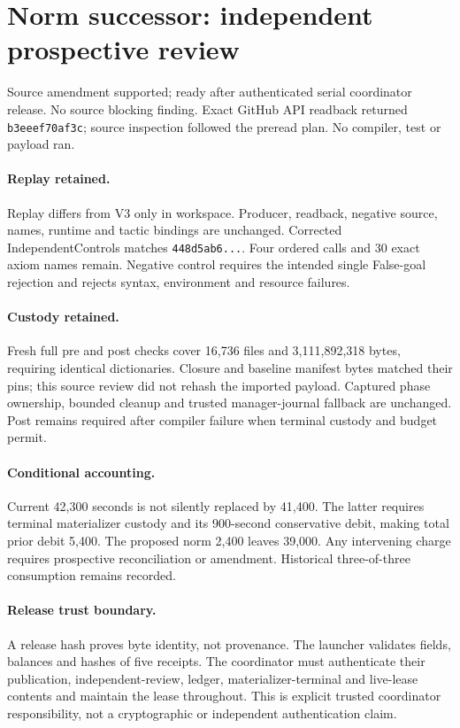 \documentclass[10pt]{article}
\begin{document}
\section*{Norm successor: independent prospective review}
Source amendment supported; ready after authenticated serial coordinator release. No source blocking finding. Exact GitHub API readback returned \texttt{b3eeef70af3c}; source inspection followed the preread plan. No compiler, test or payload ran.
\paragraph{Replay retained.} Replay differs from V3 only in workspace. Producer, readback, negative source, names, runtime and tactic bindings are unchanged. Corrected IndependentControls matches \texttt{448d5ab6...}. Four ordered calls and 30 exact axiom names remain. Negative control requires the intended single False-goal rejection and rejects syntax, environment and resource failures.
\paragraph{Custody retained.} Fresh full pre and post checks cover 16,736 files and 3,111,892,318 bytes, requiring identical dictionaries. Closure and baseline manifest bytes matched their pins; this source review did not rehash the imported payload. Captured phase ownership, bounded cleanup and trusted manager-journal fallback are unchanged. Post remains required after compiler failure when terminal custody and budget permit.
\paragraph{Conditional accounting.} Current 42,300 seconds is not silently replaced by 41,400. The latter requires terminal materializer custody and its 900-second conservative debit, making total prior debit 5,400. The proposed norm 2,400 leaves 39,000. Any intervening charge requires prospective reconciliation or amendment. Historical three-of-three consumption remains recorded.
\paragraph{Release trust boundary.} A release hash proves byte identity, not provenance. The launcher validates fields, balances and hashes of five receipts. The coordinator must authenticate their publication, independent-review, ledger, materializer-terminal and live-lease contents and maintain the lease throughout. This is explicit trusted coordinator responsibility, not a cryptographic or independent authentication claim.
\end{document}
